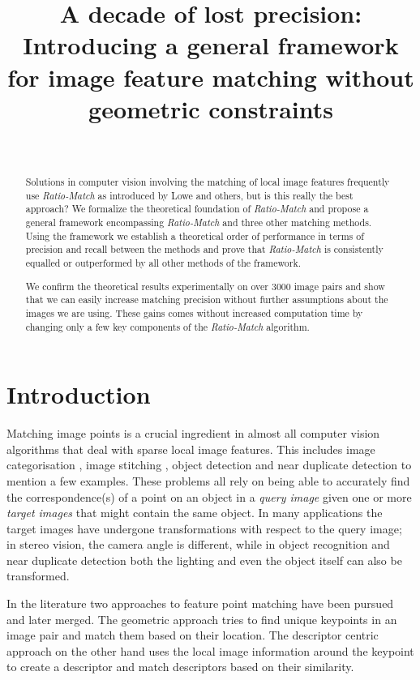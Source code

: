 \documentclass[journal]{IEEEtran}
\title{A decade of lost precision: Introducing a general framework for 
image feature matching without geometric constraints}
\author{%
\IEEEauthorblockN{%
Jonas Toft Arnfred,\IEEEauthorrefmark{1} Stefan 
Winkler,\IEEEauthorrefmark{1} Sabine S\"usstrunk\IEEEauthorrefmark{2}}\\
\vspace{1mm}
\IEEEauthorblockA{%
\IEEEauthorrefmark{1}~Advanced Digital Sciences Center (ADSC), University of Illinois at Urbana-Champaign (UIUC), Singapore\\
\IEEEauthorrefmark{2}~\'Ecole Polytechnique F\'ed\'erale de Lausanne (EPFL), Switzerland}
}
\begin{document}
\maketitle
%
\begin{abstract}
Solutions in computer vision involving the matching of local image 
features frequently use \emph{Ratio-Match} as introduced by Lowe and 
others, but is this really the best approach? We formalize the 
theoretical foundation of \emph{Ratio-Match} and propose a general 
framework encompassing \emph{Ratio-Match} and three other matching 
methods. Using the framework we establish a theoretical order of 
performance in terms of precision and recall between the methods and 
prove that \emph{Ratio-Match} is consistently equalled or outperformed 
by all other methods of the framework.

We confirm the theoretical results experimentally on over 3000 image 
pairs and show that we can easily increase matching precision
without further assumptions about the images we are using. These gains 
comes without increased computation time by changing only a few key 
components of the \emph{Ratio-Match} algorithm.

\end{abstract}
%
\section{Introduction}
%
Matching image points is a crucial ingredient in almost all computer 
vision algorithms that deal with sparse local image features. This 
includes image categorisation \cite{bosch2008scene}, image stitching 
\cite{brown2007automatic}, object detection \cite{zhang2007local} and 
near duplicate detection \cite{zhao2009scale} to mention a few examples.  
These problems all rely on being able to accurately find the 
correspondence(s) of a point on an object in a \emph{query image} given 
one or more \emph{target images} that might contain the same object.  In 
many applications the target images have undergone transformations with 
respect to the query image; in stereo vision, the camera angle is 
different, while in object recognition and near duplicate detection both 
the lighting and even the object itself can also be transformed.

In the literature two approaches to feature point matching have been 
pursued and later merged. The geometric approach tries to find unique 
keypoints in an image pair and match them based on their location.  The 
descriptor centric approach on the other hand uses the local image 
information around the keypoint to create a descriptor and match 
descriptors based on their similarity.
\end{document}

